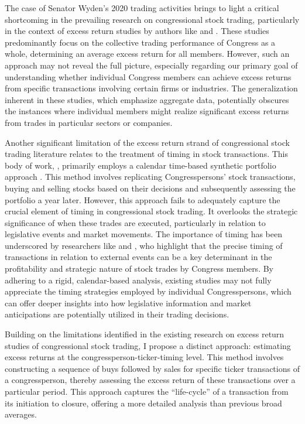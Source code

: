 \documentclass[15pt,letterpaper]{article}
\begin{document}
The case of Senator Wyden's 2020 trading activities brings to light a critical shortcoming in the prevailing research on congressional stock trading, particularly in the context of excess return studies by authors like \cite{zi24,zi11} and \cite{eg13}. These studies predominantly focus on the collective trading performance of Congress as a whole, determining an average excess return for all members. However, such an approach may not reveal the full picture, especially regarding our primary goal of understanding whether individual Congress members can achieve excess returns from specific transactions involving certain firms or industries. The generalization inherent in these studies, which emphasize aggregate data, potentially obscures the instances where individual members might realize significant excess returns from trades in particular sectors or companies.

Another significant limitation of the excess return strand of congressional stock trading literature relates to the treatment of timing in stock transactions. This body of work, \cite{zi24, zi11, eg13}, primarily employs a calendar time-based synthetic portfolio approach \citep{syn1, syn2}. This method involves replicating Congresspersons’ stock transactions, buying and selling stocks based on their decisions and subsequently assessing the portfolio a year later. However, this approach fails to adequately capture the crucial element of timing in congressional stock trading. It overlooks the strategic significance of when these trades are executed, particularly in relation to legislative events and market movements. The importance of timing has been underscored by researchers like \cite{schweizer2011} and \citep{tahoun2014}, who highlight that the precise timing of transactions in relation to external events can be a key determinant in the profitability and strategic nature of stock trades by Congress members. By adhering to a rigid, calendar-based analysis, existing studies may not fully appreciate the timing strategies employed by individual Congresspersons, which can offer deeper insights into how legislative information and market anticipations are potentially utilized in their trading decisions.

Building on the limitations identified in the existing research on excess return studies of congressional stock trading, I propose a distinct approach: estimating excess returns at the congressperson-ticker-timing level. This method involves constructing a sequence of buys followed by sales for specific ticker transactions of a congressperson, thereby assessing the excess return of these transactions over a particular period. This approach captures the ``life-cycle'' of a transaction from its initiation to closure, offering a more detailed analysis than previous broad averages.
\end{document}
